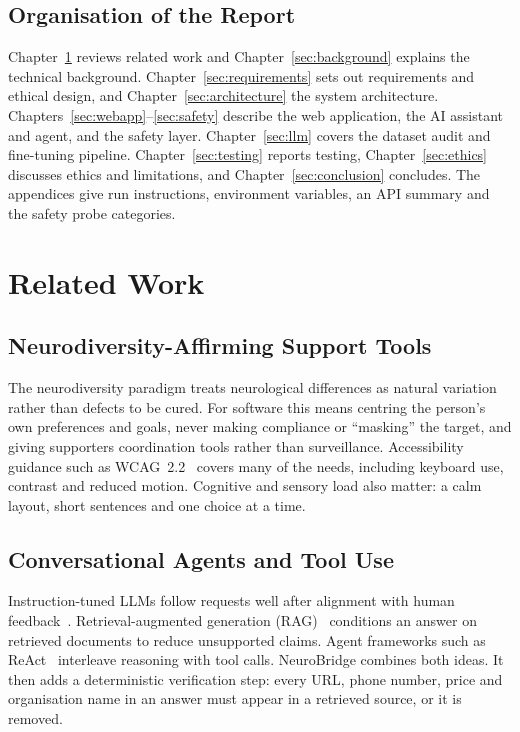 \documentclass[11pt,a4paper]{article}
\begin{document}
\subsection{Organisation of the Report}
Chapter~\ref{sec:related} reviews related work and Chapter~\ref{sec:background} explains the technical
background. Chapter~\ref{sec:requirements} sets out requirements and ethical design, and
Chapter~\ref{sec:architecture} the system architecture. Chapters~\ref{sec:webapp}--\ref{sec:safety}
describe the web application, the AI assistant and agent, and the safety layer.
Chapter~\ref{sec:llm} covers the dataset audit and fine-tuning pipeline. Chapter~\ref{sec:testing}
reports testing, Chapter~\ref{sec:ethics} discusses ethics and limitations, and
Chapter~\ref{sec:conclusion} concludes. The appendices give run instructions, environment
variables, an API summary and the safety probe categories.

\section{Related Work}\label{sec:related}

\subsection{Neurodiversity-Affirming Support Tools}
The neurodiversity paradigm treats neurological differences as natural variation rather than
defects to be cured. For software this means centring the person's own preferences and goals,
never making compliance or ``masking'' the target, and giving supporters coordination tools rather than
surveillance. Accessibility guidance such as WCAG~2.2~\cite{wcag22} covers many of the needs, including
keyboard use, contrast and reduced motion. Cognitive and sensory load also matter: a calm layout, short
sentences and one choice at a time.

\subsection{Conversational Agents and Tool Use}
Instruction-tuned LLMs follow requests well after alignment with human feedback~\cite{ouyang2022}.
Retrieval-augmented generation (RAG)~\cite{lewis2020} conditions an answer on retrieved documents
to reduce unsupported claims. Agent frameworks such as ReAct~\cite{yao2022} interleave reasoning with
tool calls. NeuroBridge combines both ideas. It then adds a deterministic verification step: every URL, phone
number, price and organisation name in an answer must appear in a retrieved source, or it is removed.
\end{document}
